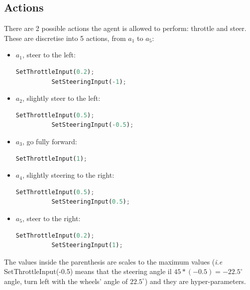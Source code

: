 \documentclass[14pt]{extarticle}
\def\sp{\vspace{5pt}}
\begin{document}
\begin{flushleft}
	\subsection{Actions}
	\sp
	There are 2 possible actions the agent is allowed to perform: throttle and steer. These are discretise into 5 actions, from $a_1$ to $a_5$:
	\begin{itemize}
	\item $a_1$, steer to the left:
		\begin{lstlisting}[mathescape=true, language=Python]
		  SetThrottleInput(0.2);
		  SetSteeringInput(-1); \end{lstlisting}
	\item $a_2$, slightly steer to the left:
		\begin{lstlisting}[mathescape=true, language=Python]
		  SetThrottleInput(0.5);
		  SetSteeringInput(-0.5); \end{lstlisting}
	\item $a_3$, go fully forward:
		\begin{lstlisting}[mathescape=true, language=Python]
		  SetThrottleInput(1); \end{lstlisting}
	\item $a_4$, slightly steering to the right:
		\begin{lstlisting}[mathescape=true, language=Python]
		  SetThrottleInput(0.5);
		  SetSteeringInput(0.5); \end{lstlisting}
	\item $a_5$, steer to the right:
		\begin{lstlisting}[mathescape=true, language=Python]
		  SetThrottleInput(0.2);
		  SetSteeringInput(1); \end{lstlisting}
	\end{itemize}
	The values inside the parenthesis are scales to the maximum values (\emph{i.e} SetThrottleInput(-0.5) means that the steering angle il $45*(-0.5)=-22.5^{\circ}$ angle, turn left with the wheels' angle of $22.5^{\circ}$) and they are hyper-parameters.

	

\end{flushleft}
\end{document}
